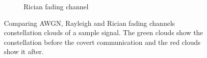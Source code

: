 \begin{figure}[tp!]
\begin{subfigure}{0.325\linewidth}
\begin{subfigure}{0.48\textwidth}
		\end{subfigure}
		\caption{Rician fading channel}
		\label{fig:rician_constellation}
	\end{subfigure}
	\caption{Comparing AWGN, Rayleigh and Rician fading channels constellation clouds of a sample signal. The green clouds show the constellation before the covert communication and the red clouds show it after.}
	\label{fig:constellation}
\end{figure}